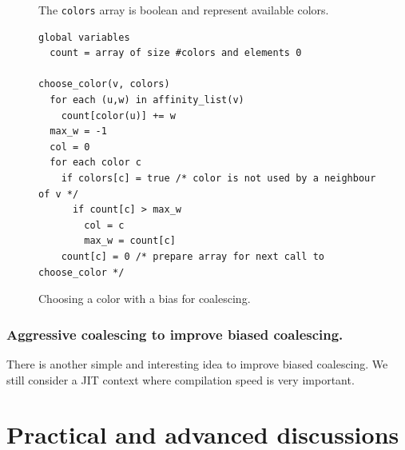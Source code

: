{\begin{figure}
  The {\tt colors} array is boolean and represent available colors.

  \begin{verbatim}
global variables
  count = array of size #colors and elements 0

choose_color(v, colors)
  for each (u,w) in affinity_list(v)
    count[color(u)] += w
  max_w = -1
  col = 0
  for each color c
    if colors[c] = true /* color is not used by a neighbour of v */
      if count[c] > max_w
        col = c
        max_w = count[c]
    count[c] = 0 /* prepare array for next call to choose_color */
  \end{verbatim}
  \caption{Choosing a color with a bias for coalescing.}
  \label{code:choose-color}
\end{figure}


\subsubsection{Aggressive coalescing to improve biased coalescing.}

There is another simple and interesting idea to improve biased coalescing. We 
still consider a JIT context where compilation speed is very important.






\section{Practical and advanced discussions}
\label{sec:practical-regalloc}


}
